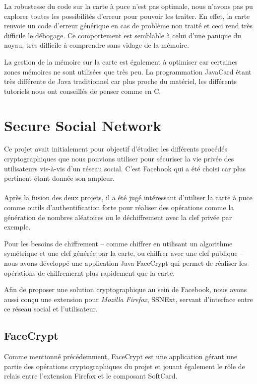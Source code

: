 \documentclass[a4paper,11pt,french]{article}
\begin{document}
La robustesse du code sur la carte à puce n'est pas optimale, nous n'avons pas pu explorer toutes les possibilités d'erreur 
pour pouvoir les traiter. En effet, la carte renvoie un code d'erreur générique en cas de problème non traité et ceci rend très difficile
 le débogage. Ce comportement est semblable à celui d'une panique du noyau, très difficile à comprendre sans vidage de la mémoire.


La gestion de la mémoire sur la carte est également à optimiser car certaines zones mémoires ne sont utilisées que très peu. La programmation JavaCard étant très différente de Java traditionnel car plus proche du matériel, les différents tutoriels nous ont conseillés de penser comme en C. 

\clearpage

\section{Secure Social Network}
Ce projet avait initialement pour objectif d'étudier les différents 
procédés cryptographiques que nous pouvions utiliser pour sécuriser la vie
privée des utilisateurs vis-à-vis d'un réseau social. C'est Facebook qui a 
été choisi car plus pertinent étant donnée son ampleur.

\paragraph{}
Après la fusion des deux projets, il a été jugé intéressant d'utiliser 
la carte à puce comme outils d'authentification forte pour réaliser des 
opérations comme la génération de nombres aléatoires ou le déchiffrement 
avec la clef privée par exemple.

Pour les besoins de chiffrement -- comme chiffrer en utilisant un algorithme
symétrique et une clef générée par la carte, ou chiffrer avec une clef
publique -- nous avons développé une application Java \og{}FaceCrypt \fg{}
qui permet de réaliser les opérations de chiffremernt plus rapidement que la
carte.

Afin de proposer une solution cryptographique au sein de Facebook, nous avons 
aussi conçu une extension pour \emph{Mozilla Firefox}, SSNExt, servant 
d'interface entre ce réseau social et l'utilisateur.

\subsection{FaceCrypt}
Comme mentionné précédemment, FaceCrypt est une application gérant une partie
des opérations cryptographiques du projet et jouant également le rôle de
relais entre l'extension Firefox et le composant SoftCard. 
\end{document}
